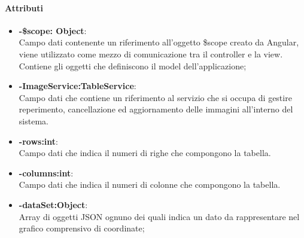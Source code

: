 	\paragraph{Attributi}
	\begin{itemize}
		\item \textbf{-\$scope: Object}:\\
			Campo dati contenente un riferimento all'oggetto \$scope creato da Angular, viene utilizzato come mezzo di comunicazione tra il controller e la view. Contiene gli oggetti che definiscono il model dell'applicazione;
		\item  \textbf{-ImageService:TableService}:\\
			Campo dati che contiene un riferimento al servizio che si occupa di gestire reperimento, cancellazione ed aggiornamento delle immagini all'interno del sistema.
		\item\textbf{-rows:int}:\\
			Campo dati che indica il numeri di righe che compongono la tabella.
		\item\textbf{-columns:int}:\\
			Campo dati che indica il numeri di colonne che compongono la tabella.
		\item\textbf{-dataSet:Object}:\\
			Array di oggetti JSON ognuno dei quali indica un dato da rappresentare nel grafico comprensivo di coordinate;
	\end{itemize}
	
